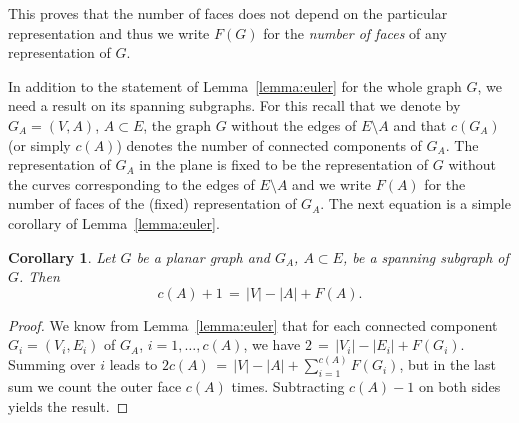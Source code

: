 \documentclass{dis}
\newtheorem{corollary}[theorem]{Corollary}
\theoremstyle{citing}
\begin{document}
This proves that the number of faces does not depend 
on the particular representation and thus we write 
$F(G)$ for the 
\emph{number of faces} 
of any representation of $G$. 

In addition to the statement of Lemma~\ref{lemma:euler} for the 
whole graph $G$, we need a result on its spanning subgraphs. 
For this recall that we denote by $G_A=(V,A)$, $A\subset E$, 
the graph $G$ without the edges of $E\setminus A$ and that 
$c(G_A)$ (or simply $c(A)$) denotes the number of connected 
components of $G_A$. The representation of $G_A$ in the plane 
is fixed to be the representation of $G$ without the curves 
corresponding to the edges of $E\setminus A$ 
and we write $F(A)$ for the number of faces of the 
(fixed) representation of $G_A$.
The next equation is a simple corollary of Lemma~\ref{lemma:euler}.

\begin{corollary}\label{coro:euler}
Let $G$ be a planar graph and $G_A$, $A\subset E$, be a spanning 
subgraph of $G$. Then
\[
c(A) + 1 \,=\, {\left\vert {V} \right\vert} - {\left\vert {A} \right\vert} + F(A).
\]
\end{corollary}

\begin{proof}
We know from Lemma~\ref{lemma:euler} that for each connected 
component $G_i=(V_i,E_i)$ of $G_A$, $i=1,\dots,c(A)$, we have 
$2 \,=\, {\left\vert {V_i} \right\vert} - {\left\vert {E_i} \right\vert} + F(G_i)$. 
Summing over $i$ leads to 
$2 c(A) \,=\, {\left\vert {V} \right\vert} - {\left\vert {A} \right\vert} + \sum_{i=1}^{c(A)} F(G_i)$, 
but in the last sum we count the outer face $c(A)$ times. 
Subtracting $c(A)-1$ on both sides yields the result.
\end{proof}
\vspace{1mm}
\end{document}

